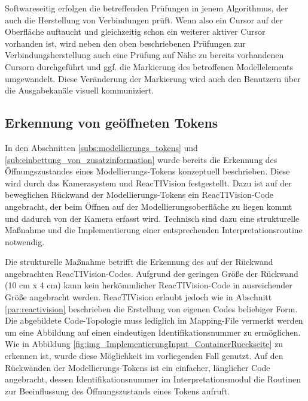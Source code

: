 Softwareseitig erfolgen die betreffenden Prüfungen in jenem Algorithmus, der auch die Herstellung von Verbindungen prüft. Wenn also ein Cursor auf der Oberfläche auftaucht und gleichzeitig schon ein weiterer aktiver Cursor vorhanden ist, wird neben den oben beschriebenen Prüfungen zur Verbindungsherstellung auch eine Prüfung auf Nähe zu bereits vorhandenen Cursorn durchgeführt und ggf. die Markierung des betroffenen Modellelements umgewandelt. Diese Veränderung der Markierung wird auch den Benutzern über die Ausgabekanäle visuell kommuniziert.


\subsection{Erkennung von geöffneten Tokens} %
\label{sub:erkennung_von_geöffneten_tokens}

In den Abschnitten \ref{subs:modellierungs_tokens} und \ref{sub:einbettung_von_zusatzinformation} wurde bereits die Erkennung des Öffnungszustandes eines Modellierungs-Tokens konzeptuell beschrieben. Diese wird durch das Kamerasystem und ReacTIVision festgestellt. Dazu ist auf der beweglichen Rückwand der Modellierungs-Tokens ein ReacTIVision-Code angebracht, der beim Öffnen auf der Modellierungsoberfläche zu liegen kommt und dadurch von der Kamera erfasst wird. Technisch sind dazu eine strukturelle Maßnahme und die Implementierung einer entsprechenden Interpretationsroutine notwendig.

Die strukturelle Maßnahme betrifft die Erkennung des auf der Rückwand angebrachten ReacTIVision-Codes. Aufgrund der geringen Größe der Rückwand (10 cm x 4 cm) kann kein herkömmlicher ReacTIVision-Code in ausreichender Größe angebracht werden. ReacTIVision erlaubt jedoch wie in Abschnitt \ref{par:reactivision} beschrieben die Erstellung von eigenen Codes beliebiger Form. Die abgebildete Code-Topologie muss lediglich im Mapping-File vermerkt werden um eine Abbildung auf einen eindeutigen Identifikationsnummer zu ermöglichen. Wie in Abbildung \ref{fig:img_ImplementierungInput_ContainerRueckseite} zu erkennen ist, wurde diese Möglichkeit im vorliegenden Fall genutzt. Auf den Rückwänden der Modellierungs-Tokens ist ein einfacher, länglicher Code angebracht, dessen Identifikationsnummer im Interpretationsmodul die Routinen zur Beeinflussung des Öffnungszustands eines Tokens aufruft.

